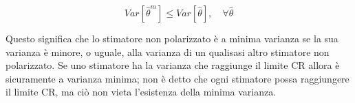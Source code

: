     \[ Var[\hat{\theta}^m]\leq Var[\hat{\theta}],\quad\forall \hat{\theta} \]

Questo significa che lo stimatore non polarizzato è a minima varianza se la sua varianza è minore, o uguale, alla varianza di un qualisasi altro stimatore non polarizzato. Se uno stimatore ha la varianza che raggiunge il limite CR  allora è sicuramente a varianza minima; non è detto che ogni stimatore possa raggiungere il limite CR, ma ciò non vieta l'esistenza della minima varianza.
